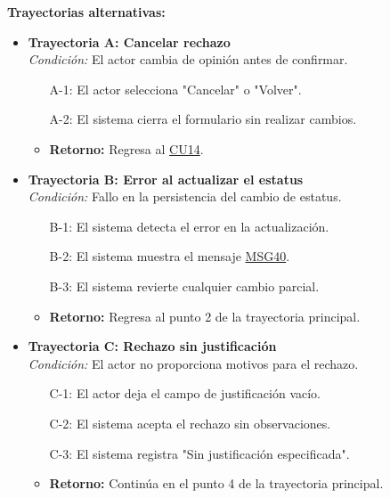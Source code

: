 \begin{appendices}
\textbf{Trayectorias alternativas:}
\begin{itemize}[leftmargin=*]
    \item \textbf{Trayectoria A: Cancelar rechazo} \\
    \textit{Condición:} El actor cambia de opinión antes de confirmar.
    \begin{itemize}[nosep]
        \item[A-1:] El actor selecciona "Cancelar" o "Volver".
        \item[A-2:] El sistema cierra el formulario sin realizar cambios.
        \item \textbf{Retorno:} Regresa al \hyperlink{anexo:casos_uso}{CU14}.
    \end{itemize}
    \item \textbf{Trayectoria B: Error al actualizar el estatus} \\
    \textit{Condición:} Fallo en la persistencia del cambio de estatus.
    \begin{itemize}[nosep]
        \item[B-1:] El sistema detecta el error en la actualización.
        \item[B-2:] El sistema muestra el mensaje \hyperlink{msg:MSG40}{MSG40}.
        \item[B-3:] El sistema revierte cualquier cambio parcial.
        \item \textbf{Retorno:} Regresa al punto 2 de la trayectoria principal.
    \end{itemize}
    \item \textbf{Trayectoria C: Rechazo sin justificación} \\
    \textit{Condición:} El actor no proporciona motivos para el rechazo.
    \begin{itemize}[nosep]
        \item[C-1:] El actor deja el campo de justificación vacío.
        \item[C-2:] El sistema acepta el rechazo sin observaciones.
        \item[C-3:] El sistema registra "Sin justificación especificada".
        \item \textbf{Retorno:} Continúa en el punto 4 de la trayectoria principal.
    \end{itemize}
\end{itemize}

\newpage


\end{appendices}
